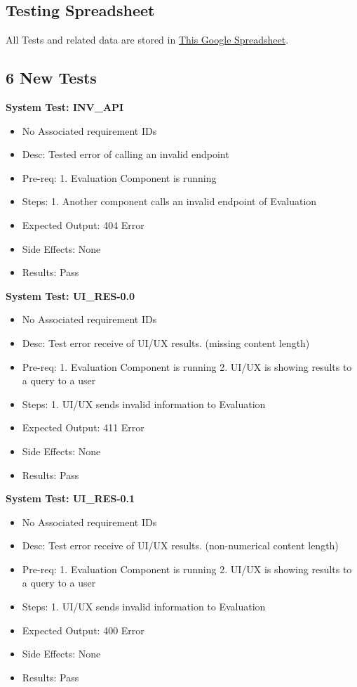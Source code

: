 \subsection*{Testing Spreadsheet}
All Tests and related data are stored in 
\href{https://docs.google.com/spreadsheets/d/1BoIIdfYPEM98kANtgATMmwdYYAYXyrwbqOqgZ7D_9U4/edit?usp=sharing}
{This Google Spreadsheet}.

\subsection*{6 New Tests}

\textbf{System Test: INV\_API}
\begin{itemize}
    \item No Associated requirement IDs
    \item Desc: Tested error of calling an invalid endpoint
    \item Pre-req: 1. Evaluation Component is running
    \item Steps: 1. Another component calls an invalid endpoint of Evaluation
    \item Expected Output: 404 Error
    \item Side Effects: None
    \item Results: Pass
\end{itemize}

\medskip\textbf{System Test: UI\_RES-0.0}
\begin{itemize}
    \item No Associated requirement IDs
    \item Desc: Test error receive of UI/UX results. (missing content length)
    \item Pre-req: 1. Evaluation Component is running 2. UI/UX is showing results to a query to a user
    \item Steps: 1. UI/UX sends invalid information to Evaluation
    \item Expected Output: 411 Error
    \item Side Effects: None
    \item Results: Pass
\end{itemize}

\medskip\textbf{System Test: UI\_RES-0.1}
\begin{itemize}
    \item No Associated requirement IDs
    \item Desc: Test error receive of UI/UX results. (non-numerical content length)
    \item Pre-req: 1. Evaluation Component is running 2. UI/UX is showing results to a query to a user
    \item Steps: 1. UI/UX sends invalid information to Evaluation
    \item Expected Output: 400 Error
    \item Side Effects: None
    \item Results: Pass
\end{itemize}

